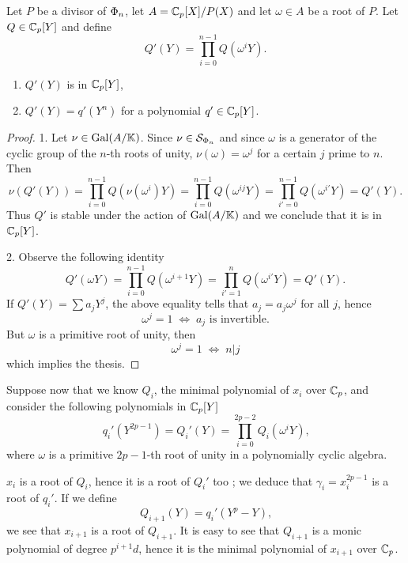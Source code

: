 \begin{lemma}
  \label{lemma:poly-cyclic}
  Let $P$ be a divisor of $\Phi_n$, let $A = \mathbb{C}_p[X]/P(X)$ and let
  $\omega\in A$ be a root of $P$. Let $Q\in\mathbb{C}_p[Y]$ and define
  \[Q'(Y) = \prod_{i=0}^{n-1}Q(\omega^iY)\text{.}\]
  \begin{enumerate}
  \item $Q'(Y)$ is in $\mathbb{C}_p[Y]$,
  \item $Q'(Y) = q'(Y^n)$ for a polynomial $q'\in\mathbb{C}_p[Y]$.
  \end{enumerate}
\end{lemma}
\begin{proof}
  1. Let $\nu\in\operatorname{Gal}(A/\mathbb{K})$. Since $\nu\in\mathcal{S}_{\Phi_n}$ and
  since $\omega$ is a generator of the cyclic group of the $n$-th
  roots of unity, $\nu(\omega) = \omega^j$ for a certain $j$ prime to
  $n$. Then
  \begin{equation*}
    \nu(Q'(Y)) = \prod_{i=0}^{n-1}Q(\nu(\omega^i)Y) =
    \prod_{i=0}^{n-1}Q(\omega^{ij}Y) = \prod_{i'=0}^{n-1}Q(\omega^{i'}Y) =
    Q'(Y)\text{.}
  \end{equation*}
  Thus $Q'$ is stable under the action of $\operatorname{Gal}(A/\mathbb{K})$ and we conclude
  that it is in $\mathbb{C}_p[Y]$.

  2. Observe the following identity
  \begin{equation*}
    Q'(\omega Y) = \prod_{i=0}^{n-1}Q(\omega^{i+1}Y) =
    \prod_{i'=1}^{n}Q(\omega^{i'}Y) = Q'(Y) \text{.}
  \end{equation*}
  If $Q'(Y) = \sum a_jY^j$, the above equality tells that $a_j =
  a_j\omega^j$ for all $j$, hence 
  \[\omega^j = 1 \;\Leftrightarrow\; a_j \text{ is invertible.}\]
  But $\omega$ is a primitive root of unity, then
  \[\omega^j = 1 \;\Leftrightarrow\; n|j\]
  which implies the thesis.
\end{proof}

Suppose now that we know $Q_i$, the minimal polynomial of $x_i$ over
$\mathbb{C}_p$, and consider the following polynomials in $\mathbb{C}_p[Y]$
\[q_i'(Y^{2p-1}) = Q_i'(Y) = \prod_{i=0}^{2p-2}Q_i(\omega^i Y)\text{,}\]
where $\omega$ is a primitive $2p-1$-th root of unity in a
polynomially cyclic algebra.

$x_i$ is a root of $Q_i$, hence it is a root of $Q_i'$ too ; we deduce
that $\gamma_i=x_i^{2p-1}$ is a root of $q_i'$. If we define
\[Q_{i+1}(Y) = q_i'(Y^p-Y)\text{,}\]
we see that $x_{i+1}$ is a root of $Q_{i+1}$. It is easy to see that
$Q_{i+1}$ is a monic polynomial of degree $p^{i+1}d$, hence it is the
minimal polynomial of $x_{i+1}$ over $\mathbb{C}_p$.

